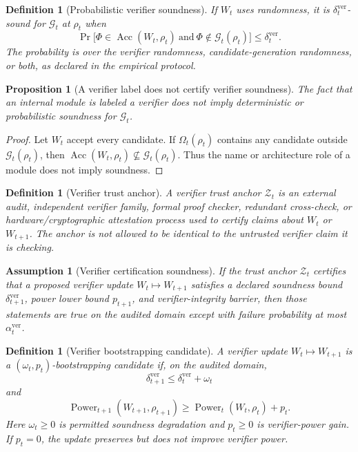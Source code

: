 \documentclass[11pt]{article}
\newtheorem{proposition}[theorem]{Proposition}
\newtheorem{definition}[theorem]{Definition}
\newtheorem{assumption}[theorem]{Assumption}
\newcommand{\Gcal}{\mathcal{G}}
\newcommand{\1}{\mathbf{1}}
\providecommand{\Zcal}{\mathcal{Z}}
\providecommand{\ver}{\mathrm{ver}}
\providecommand{\Power}{\operatorname{Power}}
\providecommand{\Acc}{\operatorname{Acc}}
\begin{document}
\begin{definition}[Probabilistic verifier soundness]
\label{def:probabilistic_verifier_soundness}
If \(W_t\) uses randomness, it is \(\delta^{\ver}_t\)-sound for \(\Gcal_t\) at \(\rho_t\) when
\[
\Pr\bigl[\Phi\in\Acc(W_t,\rho_t)\ \text{and}\ \Phi\notin\Gcal_t(\rho_t)\bigr]
\le
\delta^{\ver}_t.
\]
The probability is over the verifier randomness, candidate-generation randomness, or both, as declared in the empirical protocol.
\end{definition}

\begin{proposition}[A verifier label does not certify verifier soundness]
\label{prop:verifier_label_no_soundness}
The fact that an internal module is labeled a verifier does not imply deterministic or probabilistic soundness for \(\Gcal_t\).
\end{proposition}

\begin{proof}
Let \(W_t\) accept every candidate.  If \(\Omega_t(\rho_t)\) contains any candidate outside \(\Gcal_t(\rho_t)\), then \(\Acc(W_t,\rho_t)\nsubseteq\Gcal_t(\rho_t)\).  Thus the name or architecture role of a module does not imply soundness.
\end{proof}

\begin{definition}[Verifier trust anchor]
\label{def:verifier_trust_anchor}
A verifier trust anchor \(\Zcal_t\) is an external audit, independent verifier family, formal proof checker, redundant cross-check, or hardware/cryptographic attestation process used to certify claims about \(W_t\) or \(W_{t+1}\).  The anchor is not allowed to be identical to the untrusted verifier claim it is checking.
\end{definition}

\begin{assumption}[Verifier certification soundness]
\label{ass:verifier_certification_soundness}
If the trust anchor \(\Zcal_t\) certifies that a proposed verifier update \(W_t\mapsto W_{t+1}\) satisfies a declared soundness bound \(\delta^{\ver}_{t+1}\), power lower bound \(p_{t+1}\), and verifier-integrity barrier, then those statements are true on the audited domain except with failure probability at most \(\alpha^{\ver}_t\).
\end{assumption}

\begin{definition}[Verifier bootstrapping candidate]
\label{def:verifier_bootstrapping_candidate}
A verifier update \(W_t\mapsto W_{t+1}\) is a \((\omega_t,p_t)\)-bootstrapping candidate if, on the audited domain,
\[
\delta^{\ver}_{t+1}\le\delta^{\ver}_t+\omega_t
\]
and
\[
\Power_{t+1}(W_{t+1},\rho_{t+1})
\ge
\Power_t(W_t,\rho_t)+p_t.
\]
Here \(\omega_t\ge0\) is permitted soundness degradation and \(p_t\ge0\) is verifier-power gain.  If \(p_t=0\), the update preserves but does not improve verifier power.
\end{definition}
\end{document}
